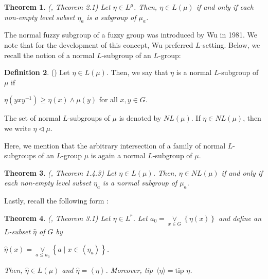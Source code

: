 \documentclass[10pt]{article}
\theoremstyle{plain}
\newtheorem{theorem}{Theorem}[section]
\theoremstyle{definition}
\newtheorem{definition}[theorem]{Definition}
\theoremstyle{remark}
\theoremstyle{case}
\begin{document}
\begin{theorem}(\cite{ajmal_nil}, Theorem 2.1)
	\label{lev_sgp}
	Let $\eta \in L^\mu$. Then, $\eta\in L(\mu)$ if and only if each non-empty level subset $\eta_a$  is a subgroup of $\mu_a$.
		
\end{theorem}

The normal fuzzy subgroup of a fuzzy group was introduced by Wu \cite{wu_normal} in 1981. We note that for the development of this concept, Wu\cite{wu_normal} preferred  $L$-setting. Below, we recall the notion of a normal $L$-subgroup of an $L$-group:

\begin{definition}(\cite{wu_normal})
	Let $\eta \in L(\mu)$. Then, we say that  $\eta$  is a normal $L$-subgroup of $\mu$   if  
	\begin{center}
		$\eta(yxy^{-1}) \geq \eta(x)\wedge \mu(y)$ for  all  $x,y \in G.$
	\end{center}
\end{definition}

\noindent The set of normal $L$-subgroups of $\mu$  is denoted by $NL(\mu)$. If $\eta \in NL(\mu)$, then we write\vspace{.2cm} $ \eta \triangleleft \mu$. 

Here, we mention that the arbitrary intersection of a family of normal $L$-subgroups of an $L$-group $\mu$ is again a normal $L$-subgroup of $\mu$. 

\begin{theorem}(\cite{mordeson_comm}, Theorem 1.4.3)
	\label{lev_norsgp}
	Let $\eta \in L(\mu)$. Then, $\eta\in NL(\mu)$ if and only if each non-empty level subset $\eta_a$  is a normal subgroup of $\mu_a$.
\end{theorem}


Lastly, recall the following form \cite{ajmal_gen}:

\begin{theorem}(\cite{ajmal_gen}, Theorem 3.1)
	\label{gen}
	Let $\eta\in L^{^{\mu}}.$ Let $a_{0}=\mathop {\vee}\limits_{x\in G}{\left\{\eta\left(x\right)\right\}}$ and define an $L$-subset $\hat{\eta}$ of $G$ by
	\begin{center}
		$\hat{\eta}\left(x\right)=\mathop{\vee}\limits_{a \leq a_{0}}{\left\{a \mid x\in\left\langle \eta_{a}\right\rangle\right\}}$.
	\end{center}
	
	\noindent Then, $\hat{\eta}\in L(\mu)$ and  $\hat{\eta} =\left\langle \eta \right\rangle$. Moreover, tip~$\langle \eta\rangle=\text{tip~}\eta$.
\end{theorem}
\end{document}
